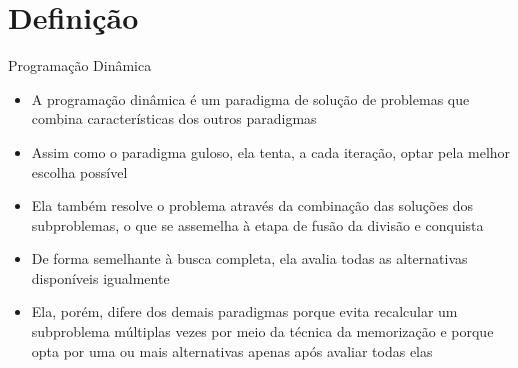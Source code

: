\section{Definição}

\begin{frame}[fragile]{Programação Dinâmica}

    \begin{itemize}
        \item A programação dinâmica é um paradigma de solução de problemas que combina
            características dos outros paradigmas
        \pause

        \item Assim como o paradigma guloso, ela tenta, a cada iteração, optar pela melhor escolha possível
        \pause

        \item Ela também resolve o problema através da combinação das soluções dos subproblemas,
            o que se assemelha à etapa de fusão da divisão e conquista
        \pause

        \item De forma semelhante à busca completa, ela avalia todas as alternativas disponíveis
            igualmente
        \pause

        \item Ela, porém, difere dos demais paradigmas porque evita recalcular um subproblema
            múltiplas vezes por meio da técnica da memorização e porque opta por uma ou mais 
            alternativas apenas após avaliar todas elas
    \end{itemize}

\end{frame}

